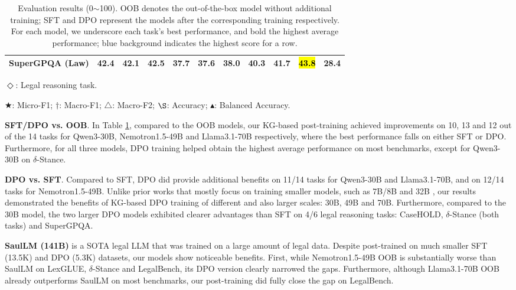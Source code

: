 \begin{table}[ht]
\begin{threeparttable}
\begin{tabular}{cccc|ccc|ccc|c}
   \hline
   \multicolumn{1}{l}{SuperGPQA (Law)\tnote{$\S$$\Diamond$}} & 42.4 & 42.1 & \textbf{42.5} & 37.7 & 37.6 & \textbf{38.0} & 40.3 & 41.7 & \hl{\textbf{43.8}} & 28.4 \\
   \hline
  \end{tabular}
  \begin{tablenotes}
    \item $\Diamond$: Legal reasoning task.
    \item $\bigstar$: Micro-F1; $\dag$: Macro-F1; $\triangle$: Macro-F2; $\S$: Accuracy; $\blacktriangle$: Balanced Accuracy.
  \end{tablenotes}
  \end{threeparttable}
  \caption{\label{table:results}
    Evaluation results (0$\sim$100). OOB denotes the out-of-the-box model without additional training; SFT and DPO represent the models after the corresponding training respectively. For each model, we underscore each task's best performance, and bold the highest average performance; blue background indicates the highest score for a row.
  }
\end{table}

\textbf{SFT/DPO vs. OOB}. In Table \ref{table:results}, compared to the OOB models, our KG-based post-training achieved improvements on 10, 13 and 12 out of the 14 tasks for Qwen3-30B, Nemotron1.5-49B and Llama3.1-70B respectively, where the best performance falls on either SFT or DPO. Furthermore, for all three models, DPO training helped obtain the highest average performance on most benchmarks, except for Qwen3-30B on $\delta$-Stance.

\textbf{DPO vs. SFT}. Compared to SFT, DPO did provide additional benefits on 11/14 tasks for Qwen3-30B and Llama3.1-70B, and on 12/14 tasks for Nemotron1.5-49B. Unlike prior works that mostly focus on training smaller models, such as 7B/8B \cite{DBLP:conf/aaai/FanHW0JS25,DBLP:journals/corr/abs-2507-00018,DBLP:journals/corr/abs-2404-14723} and 32B \cite{wen-etal-2025-light}, our results demonstrated the benefits of KG-based DPO training of different and also larger scales: 30B, 49B and 70B. Furthermore, compared to the 30B model, the two larger DPO models exhibited clearer advantages than SFT on 4/6 legal reasoning tasks: CaseHOLD, $\delta$-Stance (both tasks) and SuperGPQA.

\textbf{SaulLM (141B)} \cite{DBLP:conf/nips/ColomboPBMHMCCD24} is a SOTA legal LLM that was trained on a large amount of legal data. Despite post-trained on much smaller SFT (13.5K) and DPO (5.3K) datasets, our models show noticeable benefits. First, while Nemotron1.5-49B OOB is substantially worse than SaulLM on LexGLUE, $\delta$-Stance and LegalBench, its DPO version clearly narrowed the gaps. Furthermore, although Llama3.1-70B OOB already outperforms SaulLM on most benchmarks, our post-training did fully close the gap on LegalBench.

